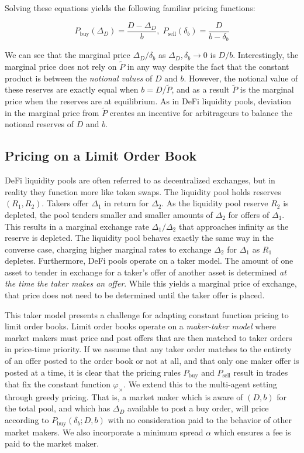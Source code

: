 \documentclass{article}
\begin{document}
Solving these equations yields the following familiar pricing functions:

\begin{equation}
P_{\mathrm{buy}}(\Delta_D) = \frac{D - \Delta_D}{b}, \;
P_{\mathrm{sell}}(\delta_b) = \frac{D}{b - \delta_b}
\end{equation}

We can see that the marginal price $\Delta_D / \delta_b$ as $\Delta_D, \delta_b \rightarrow 0$ is $D / b$. Interestingly, the marginal price does not rely on $\tilde{P}$ in any way despite the fact that the constant product is between the \emph{notional values} of $D$ and $b$. However, the notional value of these reserves are exactly equal when $b = D / \tilde{P}$, and as a result $\tilde{P}$ is the marginal price when the reserves are at equilibrium. As in DeFi liquidity pools, deviation in the marginal price from $\tilde{P}$ creates an incentive for arbitrageurs to balance the notional reserves of $D$ and $b$.

\subsection{Pricing on a Limit Order Book}

DeFi liquidity pools are often referred to as decentralized exchanges, but in reality they function more like token swaps. The liquidity pool holds reserves $(R_1, R_2)$. Takers offer $\Delta_1$ in return for $\Delta_2$. As the liquidity pool reserve $R_2$ is depleted, the pool tenders smaller and smaller amounts of $\Delta_2$ for offers of $\Delta_1$. This results in a marginal exchange rate $\Delta_1 / \Delta_2$ that approaches infinity as the reserve is depleted. The liquidity pool behaves exactly the same way in the converse case, charging higher marginal rates to exchange $\Delta_2$ for $\Delta_1$ as $R_1$ depletes. Furthermore, DeFi pools operate on a taker model. The amount of one asset to tender in exchange for a taker's offer of another asset is determined \emph{at the time the taker makes an offer}. While this yields a marginal price of exchange, that price does not need to be determined until the taker offer is placed.

This taker model presents a challenge for adapting constant function pricing to limit order books. Limit order books operate on a \emph{maker-taker model} where market makers must price and post offers that are then matched to taker orders in price-time priority. If we assume that any taker order matches to the entirety of an offer posted to the order book or not at all, and that only one maker offer is posted at a time, it is clear that the pricing rules $P_{\mathrm{buy}}$ and $P_{\mathrm{sell}}$ result in trades that fix the constant function $\varphi_{\times}$. We extend this to the multi-agent setting through greedy pricing. That is, a market maker which is aware of $(D, b)$ for the total pool, and which has $\Delta_D$ available to post a buy order, will price according to $P_{\mathrm{buy}}(\delta_b; D, b)$ with no consideration paid to the behavior of other market makers. We also incorporate a minimum spread $\alpha$ which ensures a fee is paid to the market maker.
\end{document}

